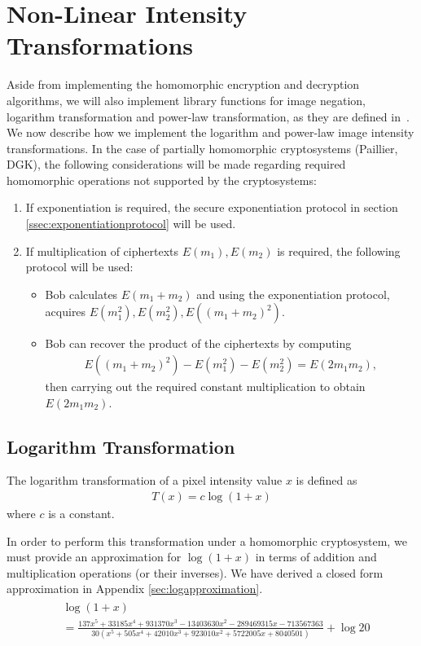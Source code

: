 \section{Non-Linear Intensity Transformations}
Aside from implementing the homomorphic encryption and decryption algorithms, we will also implement library functions for image negation, logarithm transformation and power-law transformation, as they are defined in~\cite{gonzalez_digital_2008}.
We now describe how we implement the logarithm and power-law image intensity transformations. In the case of partially homomorphic cryptosystems (Paillier, DGK), the following considerations will be made regarding required homomorphic operations not supported by the cryptosystems:
\begin{enumerate}
	\item If exponentiation is required, the secure exponentiation protocol in section \ref{ssec:exponentiationprotocol} will be used.
	\item If multiplication of ciphertexts $E(m_1), E(m_2)$ is required, the following protocol will be used:
	\begin{itemize}
		\item Bob calculates $E(m_1+m_2)$ and using the exponentiation protocol, acquires $E(m_1^2),E(m_2^2),E((m_1+m_2)^2)$.
		\item Bob can recover the product of the ciphertexts by computing
		\begin{align*}
			E((m_1+m_2)^2) - E(m_1^2) - E(m_2^2) = E(2m_1m_2),
		\end{align*}
		then carrying out the required constant multiplication to obtain $E(2m_1m_2)$.
	\end{itemize}
\end{enumerate}
\subsection{Logarithm Transformation}
The logarithm transformation of a pixel intensity value $x$ is defined as
\begin{align}
	T\left(x\right) = c \log\left(1 + x\right)
\end{align}
where $c$ is a constant.

In order to perform this transformation under a homomorphic cryptosystem, we must provide an approximation for $\log\left(1 + x\right)$ in terms of addition and multiplication operations (or their inverses). We have derived a closed form approximation in Appendix \ref{sec:logapproximation}.
\begin{align}
	\label{eq:scaledquadraturech3}
  \begin{split}
    &\log(1+x) \\
    &=\frac{137x^5 + 33185x^4 + 931370x^3 - 13403630x^2 - 289469315x - 713567363}
    {30(x^5 + 505x^4 + 42010x^3 + 923010x^2 + 5722005x + 8040501)} + \log{20}
  \end{split}
\end{align}

